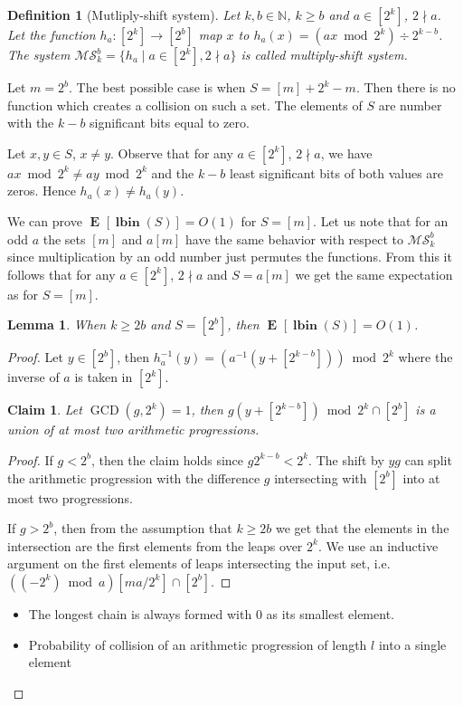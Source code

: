 \documentclass{article}
\newcommand{\vlbin}[1]{\operatorname{\mathbf{lbin}}({#1})}
\newcommand{\expects}[2]{\operatorname{\mathbf{E}}_{{#1}}\left[{#2}\right]}
\newcommand{\expect}[1]{\expects{}{#1}}
\newtheorem{lemma}{Lemma}
\newtheorem{definition}{Definition}
\newtheorem{claim}{Claim}
\begin{document}
\begin{definition}[Mutliply-shift system]
Let $k, b \in \mathbb{N}$, $k \geq b$ and $a \in [2^k]$, $2 \nmid a$.
Let the function $h_a \colon [2^k] \to [2^b]$ map $x$ to $h_a(x) =(ax \bmod 2^k) \div 2^{k - b}$.
The system $\mathcal{MS}_{k}^{b} = \{h_a \mid a \in [2^k], 2 \nmid a\}$ is called \emph{multiply-shift system}.

\end{definition}

Let $m = 2^b$.
The best possible case is when $S = [m] + 2^{k} - m$. Then there is no function which creates a collision on such a set.
The elements of $S$ are number with the $k-b$ significant bits equal to zero.

Let $x, y \in S$, $x \neq y$. Observe that for any $a \in [2^k]$, $2 \nmid a$, we have $ax \bmod 2^k \neq ay \bmod 2^k$ and the $k - b$ least significant bits of both values are zeros.
Hence $h_a(x) \neq h_a(y)$.

We can prove $\expect{\vlbin{S}} = O(1)$ for $S = [m]$.
Let us note that for an odd $a$ the sets $[m]$ and $a[m]$ have the same behavior with respect to $\mathcal{MS}_{k}^{b}$ since multiplication by an odd number just permutes the functions.
From this it follows that for any $a \in [2^k]$, $2 \nmid a$ and $S = a[m]$ we get the same expectation as for $S = [m]$. 
\begin{lemma}
When $k \geq 2b$ and $S = [2^b]$, then $\expect{\vlbin{S}} = O(1)$.
\end{lemma}
\begin{proof}
Let $y \in [2^b]$, then $h_a^{-1}(y) = (a^{-1} (y + [2^{k - b}])) \bmod 2^k$ where the inverse of $a$ is taken in $[2^k]$.
\begin{claim}
Let $\operatorname{GCD}(g, 2^k) = 1$, then $g(y + [2^{k - b}]) \bmod 2^{k} \cap [2^b]$ is a union of at most two arithmetic progressions.
\end{claim}
\begin{proof}
If $g < 2^b$, then the claim holds since $g2^{k - b} < 2^k$. The shift by $yg$ can split the arithmetic progression with the difference $g$ intersecting with $[2^{b}]$ into at most two progressions.

If $g > 2^b$, then from the assumption that $k \geq 2b$  we get that the elements in the intersection are the first elements from the leaps over $2^k$. We use an inductive argument on the first elements of leaps intersecting the input set, i.e. $((-2^k) \bmod a) [ma/2^k] \cap [2^b]$.
\end{proof}

\begin{itemize}
 \item The longest chain is always formed with $0$ as its smallest element.
 \item Probability of collision of an arithmetic progression of length $l$ into a single element
\end{itemize}
\end{proof}
\end{document}
